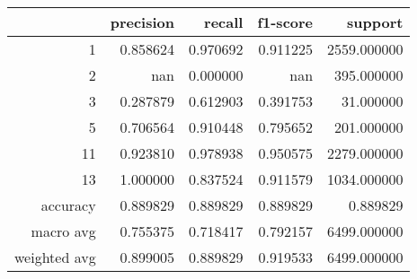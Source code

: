 \begin{tabular}{rrrrr}
\toprule
 & precision & recall & f1-score & support \\
\midrule
1 & 0.858624 & 0.970692 & 0.911225 & 2559.000000 \\
2 & nan & 0.000000 & nan & 395.000000 \\
3 & 0.287879 & 0.612903 & 0.391753 & 31.000000 \\
5 & 0.706564 & 0.910448 & 0.795652 & 201.000000 \\
11 & 0.923810 & 0.978938 & 0.950575 & 2279.000000 \\
13 & 1.000000 & 0.837524 & 0.911579 & 1034.000000 \\
accuracy & 0.889829 & 0.889829 & 0.889829 & 0.889829 \\
macro avg & 0.755375 & 0.718417 & 0.792157 & 6499.000000 \\
weighted avg & 0.899005 & 0.889829 & 0.919533 & 6499.000000 \\
\bottomrule
\end{tabular}
